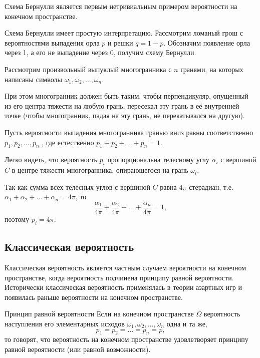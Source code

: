 Схема Бернулли является первым нетривиальным примером вероятности на конечном пространстве.

Схема Бернулли имеет простую интерпретацию. Рассмотрим ломаный грош с вероятностями выпадения орла $p$ и решки $q = 1 − p$. Обозначим появление орла через 1, а его не выпадение через 0, получим схему Бернулли.

\begin{example}
	\label{ex:4.9}
Рассмотрим произвольный выпуклый многогранника с $n$ гранями, на которых написаны символы $\omega_1 , \omega_2 , \ldots , \omega_n$.

При этом многогранник должен быть таким, чтобы перпендикуляр, опущенный из его центра тяжести на любую грань, пересекал эту грань в её внутренней точке (чтобы многогранник, падая на эту грань, не перекатывался на другую).

Пусть вероятности выпадения многогранника гранью вниз равны соответственно $p_1 , p_2 , \ldots , p_n$ , где естественно $p_1 + p_2 + \ldots +p_n = 1$. 

Легко видеть, что вероятность $p_i$ пропорциональна телесному углу $\alpha_i$ с вершиной $C$ в центре тяжести многогранника, опирающегося на грань $\omega_i$.

Так как сумма всех телесных углов с вершиной $C$ равна $4\pi$ стерадиан, т.е. $\alpha_1 + \alpha_2 + \ldots + \alpha_n = 4\pi$, то
$$\frac{\alpha_1}{4\pi} + \frac{\alpha_2}{4\pi} + \ldots + \frac{\alpha_n}{4\pi}
 = 1,$$ поэтому $p_i = 4\pi$.
\end{example}

\subsection{Классическая вероятность}
\label{par:4.3}

Классическая вероятность является частным случаем вероятности на конечном пространстве, когда вероятность подчинена принципу равной вероятности. Исторически классическая вероятность применялась в теории азартных игр и появилась раньше вероятности на конечном пространстве.

\begin{repdefinition}{Принцип равной вероятности}
	Если на конечном пространстве $\Omega$ вероятность наступления его элементарных исходов $\omega_1 , \omega_2 , \ldots , \omega_n$ одна и та же,
$$p_1 = p_2 = \ldots = p_n = p,$$
то говорят, что вероятность на конечном пространстве удовлетворяет
принципу равной вероятности (или равной возможности).
\end{repdefinition}

